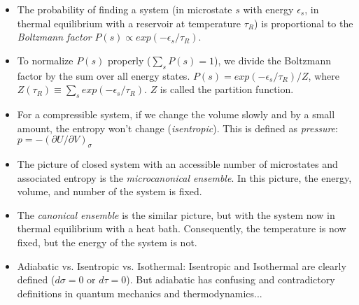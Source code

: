 \begin{itemize}
\item The probability of finding a system (in microstate $s$ with
	energy $\epsilon_s$, in thermal equilibrium with a reservoir 
	at temperature $\tau_R$) is proportional to the 
	\emph{Boltzmann factor} $P(s) \propto exp(-\epsilon_s/\tau_R)$.

\item To normalize $P(s)$ properly ($\sum_{s} P(s) = 1$), we divide
	the Boltzmann factor by the sum over all energy states.
	$P(s) = exp(-\epsilon_s/\tau_R)/Z$, where 
	$Z(\tau_R) \equiv \sum_{s} exp(-\epsilon_s/\tau_R)$. $Z$ is called the
	partition function.

\item For a compressible system, if we change the volume slowly and by
	a small amount, the entropy won't change (\textit{isentropic}). This
	is defined as \textit{pressure}: $p = -(\partial U/\partial V)_\sigma$

\item The picture of closed system with an accessible number of microstates
	and associated entropy is the \emph{microcanonical ensemble}. In this picture, the energy, volume, and number of the system is fixed.

\item The \emph{canonical ensemble} is the similar picture, but with 
	the system now in thermal equilibrium with a heat bath. Consequently,
	the temperature is now fixed, but the energy of the system is not.

\item Adiabatic vs. Isentropic vs. Isothermal: Isentropic and 
	Isothermal are clearly defined ($d\sigma = 0$ or $d\tau = 0$). But
	adiabatic has confusing and contradictory definitions in quantum
	mechanics and thermodynamics...
\end{itemize}




